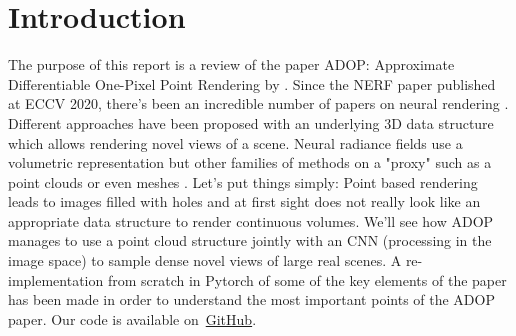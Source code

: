 \section{Introduction}
\label{sec:intro}
The purpose of this report is a review of the paper ADOP: Approximate Differentiable One-Pixel Point Rendering by \citet{ruckert2022adop}. 
Since the NERF paper published at ECCV 2020, there's been an incredible number of papers on neural rendering . Different approaches have been proposed with an underlying 3D data structure which allows rendering novel views of a scene. Neural radiance fields use a volumetric representation but other families of methods on a "proxy" such as a point clouds \cite{Aliev2020} or even meshes \cite{worchel2022nds}.
Let's put things simply: Point based rendering leads to images filled with holes and at first sight does not really look like an appropriate data structure to render continuous volumes.
We'll see how ADOP manages to use a point cloud structure jointly with an CNN (processing in the image space) to sample dense novel views of large real scenes.
A re-implementation from scratch in Pytorch of some of the key elements of the paper has been made in order to understand the most important points of the ADOP paper.
Our code is available on~\href{https://github.com/balthazarneveu/per-pixel-point-rendering}{GitHub}.
